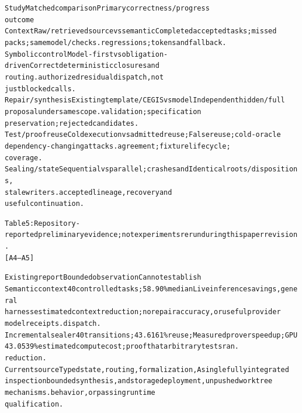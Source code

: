 \begingroup\fontsize{7}{8.4}\selectfont
\begin{alltt}
Study                     Matched comparison                        Primary correctness / progress
                                                                    outcome
Context                   Raw/retrieved source vs semantic          Completed accepted tasks; missed
                          packs; same model/checks.                 regressions; tokens and fallback.
Symbolic control          Model-first vs obligation-driven          Correct deterministic closures and
                          routing.                                  authorized residual dispatch, not
                                                                    just blocked calls.
Repair / synthesis        Existing template/CEGIS vs model          Independent hidden/full
                          proposal under same scope.                validation; specification
                                                                    preservation; rejected candidates.
Test / proof reuse        Cold execution vs admitted reuse;         False reuse; cold-oracle
                          dependency-changing attacks.              agreement; fixture lifecycle;
                                                                    coverage.
Sealing / state           Sequential vs parallel; crashes and       Identical roots/dispositions,
                          stale writers.                            accepted lineage, recovery and
                                                                    useful continuation.
\end{alltt}\endgroup



\begingroup\fontsize{7}{8.4}\selectfont
\begin{alltt}
Table 5: Repository-reported preliminary evidence; not experiments rerun during this paper revision.
[A4–A5]
\end{alltt}\endgroup

\begingroup\fontsize{7}{8.4}\selectfont
\begin{alltt}
Existing report           Bounded observation                       Cannot establish
Semantic context          40 controlled tasks; 58.90\% median        Live inference savings, general
harness                   estimated context reduction; no           repair accuracy, or useful provider
                          model receipts.                           dispatch.
Incremental sealer        40 transitions; 43.6161\% reuse;           Measured prover speedup; GPU
                          43.0539\% estimated compute                cost; proof that arbitrary tests ran.
                          reduction.
Current source            Typed state, routing, formalization,      A single fully integrated
inspection                bounded synthesis, and storage            deployment, unpushed worktree
                          mechanisms.                               behavior, or passing runtime
                                                                    qualification.
\end{alltt}\endgroup




